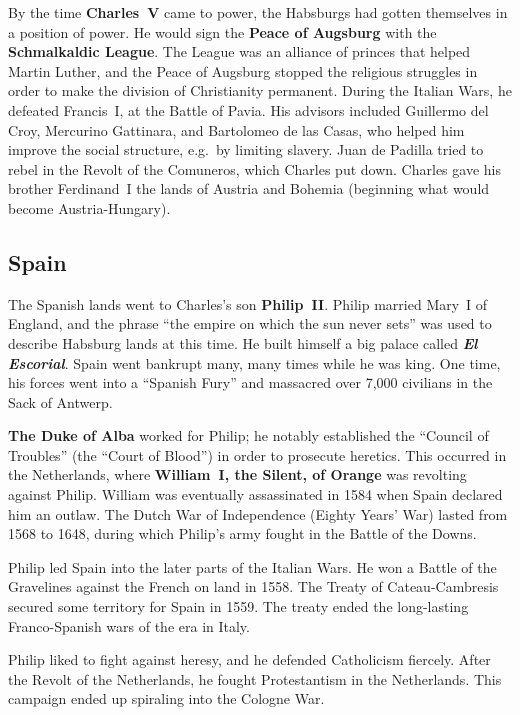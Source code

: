 By the time \textbf{Charles~V} came to power,
the Habsburgs had gotten themselves in a position of power.
He would sign the \textbf{Peace of Augsburg} with the \textbf{Schmalkaldic League}.
The League was an alliance of princes that helped Martin Luther,
and the Peace of Augsburg stopped the religious struggles
in order to make the division of Christianity permanent.
During the Italian Wars, he defeated Francis~I, at the Battle of Pavia.
His advisors included Guillermo del Croy, Mercurino Gattinara, and Bartolomeo de las Casas,
who helped him improve the social structure, e.g.\ by limiting slavery.
Juan de Padilla tried to rebel in the Revolt of the Comuneros, which Charles put down.
Charles gave his brother Ferdinand~I the lands of Austria and Bohemia
(beginning what would become Austria-Hungary).

\subsection*{Spain}

The Spanish lands went to Charles's son \textbf{Philip~II}.
Philip married Mary~I of England, and the phrase ``the empire on which the sun never sets''
was used to describe Habsburg lands at this time.
He built himself a big palace called \textbf{\textit{El Escorial}}.
Spain went bankrupt many, many times while he was king.
One time,
his forces went into a ``Spanish Fury'' and massacred over 7,000 civilians in the Sack of Antwerp.

\textbf{The Duke of Alba} worked for Philip;
he notably established the ``Council of Troubles'' (the ``Court of Blood'')
in order to prosecute heretics.
This occurred in the Netherlands,
where \textbf{William~I, the Silent, of Orange} was revolting against Philip.
William was eventually assassinated in 1584 when Spain declared him an outlaw.
The Dutch War of Independence (Eighty Years' War) lasted from 1568 to 1648,
during which Philip's army fought in the Battle of the Downs.

Philip led Spain into the later parts of the Italian Wars.
He won a Battle of the Gravelines against the French on land in 1558.
The Treaty of Cateau-Cambresis secured some territory for Spain in 1559.
The treaty ended the long-lasting Franco-Spanish wars of the era in Italy.

Philip liked to fight against heresy, and he defended Catholicism fiercely.
After the Revolt of the Netherlands, he fought Protestantism in the Netherlands.
This campaign ended up spiraling into the Cologne War.

